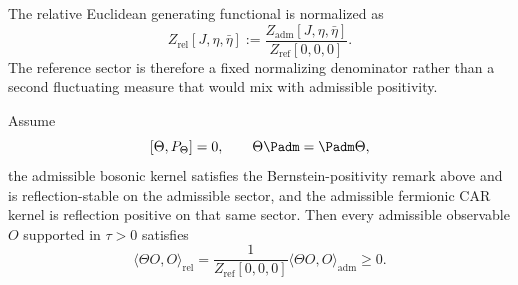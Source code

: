 \begin{definition}
\label{def:relative-generating-functional}
The relative Euclidean generating functional is normalized as
\[
Z_{\mathrm{rel}}[J,\eta,\bar\eta]
:=
\frac{Z_{\mathrm{adm}}[J,\eta,\bar\eta]}{Z_{\mathrm{ref}}[0,0,0]}.
\]
The reference sector is therefore a fixed normalizing denominator rather than a second fluctuating measure that would mix with admissible positivity.
\end{definition}

\begin{lemma}
\label{lem:admissible-reflection-positivity}
Assume
\[
[\Theta,P_\Theta]=0,
\qquad
\Theta\Padm=\Padm\Theta,
\]
the admissible bosonic kernel satisfies the Bernstein-positivity remark above and is
reflection-stable on the admissible sector, and the
admissible fermionic CAR kernel is reflection positive on that same sector. Then every
admissible observable $O$ supported in $\tau>0$ satisfies
\[
\langle \Theta O,O\rangle_{\mathrm{rel}}
=
\frac{1}{Z_{\mathrm{ref}}[0,0,0]}
\langle \Theta O,O\rangle_{\mathrm{adm}}
\ge 0.
\]
\end{lemma}
